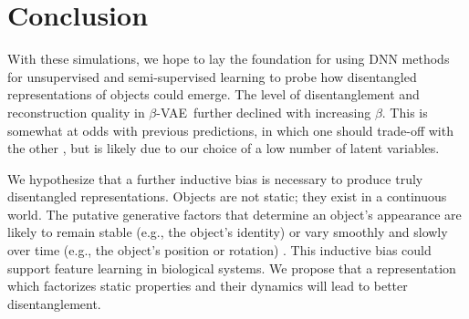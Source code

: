 \documentclass[10pt,letterpaper]{article}
\newcommand{\bvae}{$\beta$-VAE~}
\begin{document}


\section{Conclusion}

With these simulations, we hope to lay the foundation for using DNN methods for unsupervised and semi-supervised learning to probe how disentangled representations of objects could emerge. The level of disentanglement and reconstruction quality in \bvae further declined with increasing $\beta$. This is somewhat at odds with previous predictions, in which one should trade-off with the other \cite{Higgins2017,Alemi2017}, but is likely due to our choice of a low number of latent variables.

We hypothesize that a further inductive bias is necessary to produce truly disentangled representations. Objects are not static; they exist in a continuous world. The putative generative factors that determine an object’s appearance are likely to remain stable (e.g., the object's identity) or vary smoothly and slowly over time (e.g., the object's position or rotation) \cite{Wiskott2002}. This inductive bias could support feature learning in biological systems. We propose that a representation which factorizes static properties and their dynamics will lead to better disentanglement.

\bigskip



\setlength{\bibleftmargin}{.125in}
\setlength{\bibindent}{-\bibleftmargin}

\end{document}

